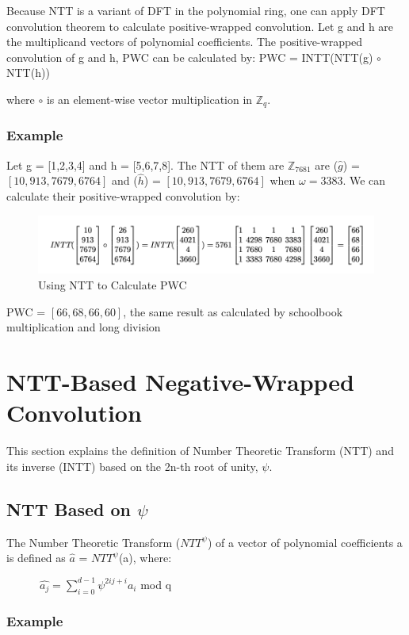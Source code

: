 \documentclass{techrep}
\theoremstyle{definition}
\theoremstyle{plain}
\newcommand{\Z}{\mathbb{Z}}
\begin{document}
	Because NTT is a variant of DFT in the polynomial ring, one can apply DFT convolution theorem to calculate positive-wrapped convolution. Let g and h are the multiplicand vectors of polynomial coefficients. The positive-wrapped convolution of g and h, PWC can be calculated by:
	PWC = INTT(NTT(g) $\circ$ NTT(h))

	where $\circ$ is an element-wise vector multiplication in $\Z_{q}$.

	\subsubsection{Example}
	Let g = [1,2,3,4] and h = [5,6,7,8]. The NTT of them are $\Z_{7681}$ are ($\hat{g}$) = $[10, 913, 7679, 6764]$ and ($\hat{h}$) = $[10, 913, 7679, 6764]$ when $\omega =3383$. We can calculate their positive-wrapped convolution by:

	\begin{figure}[H]
		\centering
		\includegraphics[width=.9\columnwidth]{fig/PWC_NTT.png}
		\caption{Using NTT to Calculate PWC}
		\label{fig:PWC_NTT}
	\end{figure}

	PWC = $[66, 68, 66, 60]$, the same result as calculated by schoolbook multiplication and long division



	\section{NTT-Based Negative-Wrapped Convolution}
	This section explains the definition of Number Theoretic Transform (NTT) and its inverse (INTT) based on the 2n-th root of unity, $\psi$.

	\subsection{NTT Based on $\psi$}
	The Number Theoretic Transform (${NTT}^\psi$) of a vector of polynomial coefficients a is defined as $\hat{a}$ = ${NTT}^\psi$(a), where:

	$\quad \quad \quad \hat{a_j} = \sum_{i=0}^{d - 1}\psi^{2ij+i}a_i$ mod q

	\subsubsection{Example}
\end{document}
